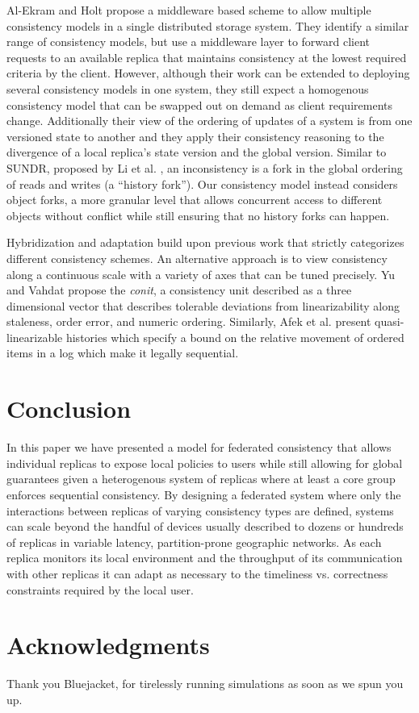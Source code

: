 \documentclass[10pt,conference,compsocconf,letterpaper]{IEEEtran}
\begin{document}
Al-Ekram and Holt \cite{al-ekram_multi-consistency_2010} propose a middleware based scheme to allow multiple consistency models in a single distributed storage system. They identify a similar range of consistency models, but use a middleware layer to forward client requests to an available replica that maintains consistency at the lowest required criteria by the client. However, although their work can be extended to deploying several consistency models in one system, they still expect a homogenous consistency model that can be swapped out on demand as client requirements change. Additionally their view of the ordering of updates of a system is from one versioned state to another and they apply their consistency reasoning to the divergence of a local replica's state version and the global version. Similar to SUNDR, proposed by Li et al. \cite{li_secure_2004}, an inconsistency is a fork in the global ordering of reads and writes (a ``history fork''). Our consistency model instead considers object forks, a more granular level that allows concurrent access to different objects without conflict while still ensuring that no history forks can happen.

Hybridization and adaptation build upon previous work that strictly categorizes different consistency schemes. An alternative approach is to view consistency along a continuous scale with a variety of axes that can be tuned precisely. Yu and Vahdat \cite{yu_design_2002} propose the \textit{conit}, a consistency unit described as a three dimensional vector that describes tolerable deviations from linearizability along staleness, order error, and numeric ordering. Similarly, Afek et al. \cite{afek_quasi-linearizability:_2010} present quasi-linearizable histories which specify a bound on the relative movement of ordered items in a log which make it legally sequential.

\section{Conclusion}

In this paper we have presented a model for federated consistency that allows individual replicas to expose local policies to users while still allowing for global guarantees given a heterogenous system of replicas where at least a core group enforces sequential consistency. By designing a federated system where only the interactions between replicas of varying consistency types are defined, systems can scale beyond the handful of devices usually described to dozens or hundreds of replicas in variable latency, partition-prone geographic networks. As each replica monitors its local environment and the throughput of its communication with other replicas it can adapt as necessary to the timeliness vs. correctness constraints required by the local user.

\section*{Acknowledgments}

Thank you Bluejacket, for tirelessly running simulations as soon as we spun you up.



\end{document}
